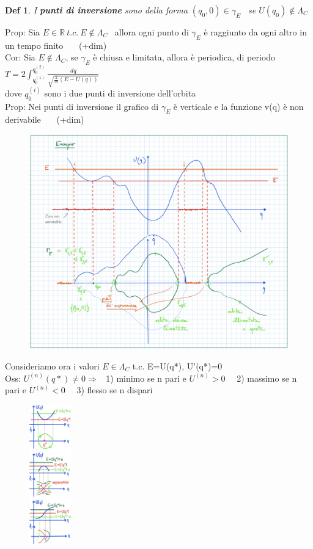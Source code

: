 \documentclass{article}
\theoremstyle{unnumbered}
\newtheorem* {theoremT}{Def}
\theoremstyle{unnumbered1}
\newenvironment{defi}{\begin{gBox}\begin{theoremT}}{\end{theoremT}\end{gBox}}
\begin{document}
%
%
%
\begin{defi}
I \textbf{punti di inversione} sono della forma $(q_0,0)\in\gamma_E$ \ se $U(q_0)\not\in \Lambda_C$
\end{defi}
%
Prop: Sia $E\in\mathbb{R} \ t.c. \ E \not\in\Lambda_C$ \ allora ogni punto di $\gamma_E$ è raggiunto da ogni altro in un tempo finito \ \ \ (+dim)\\
Cor: Sia $E \not\in\Lambda_C$, se $\gamma_E$ è chiusa e limitata, allora è periodica, di periodo \ $T=2\int_{q_0^{(1)}}^{q_0^{(2)}}\frac{dq}{\sqrt{\frac{2}{m}(E-U(q))}}$ \\ 
\phantom{Cor: }dove ${q_0^{(i)}}$ sono i due punti di inversione dell'orbita \\
Prop: Nei punti di inversione il grafico di $\gamma_E$ è verticale e la funzione v(q) è non derivabile \ \ \ (+dim)
%
%
%
\begin{figure}[h!]
\begin{center}
  \includegraphics[width=13cm]{CurveLivello.jpeg}\\
\end{center}
\end{figure}
\newpage
%
%
%
Consideriamo ora i valori $E\in\Lambda_C$ t.c. E=U(q*), U'(q*)=0 \\
Oss: $U^{(n)}(q*)\neq 0 \Rightarrow$ \ 1) minimo se n pari e  $U^{(n)} > 0$ \ \ 2) massimo se n pari e $U^{(n)} < 0$ \ \ 3) flesso se n dispari 
%
%
%
\begin{figure}
\includegraphics[width=0.16\textwidth]{PuntiCritici2.jpeg}
\end{figure}\\
\end{document}
